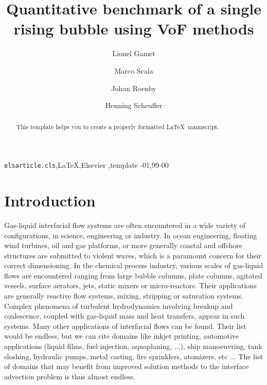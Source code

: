 \documentclass[review]{elsarticle}
\begin{document}
\begin{frontmatter}

\title{Quantitative benchmark of a single rising bubble using VoF methods}

\author[ifpenaddress]{Lionel Gamet}

\author[ifpenaddress]{Marco Scala}

\author[stromningaddress]{Johan Roenby}

\author[dlraddress]{Henning Scheufler}

\address[ifpenaddress]{IFPEN Lyon, Process Experimentation Division, 69360 Solaize, France}
\address[stromningaddress]{STROMNING, Luftmarinegade 62, 1432 K{\o}benhavn K, Denmark}
\address[dlraddress]{DLR German Aerospace Center, Institute of Space Systems, 28359 Bremen, Germany}

\begin{abstract}
This template helps you to create a properly formatted \LaTeX\ manuscript.
\end{abstract}

\begin{keyword}
\texttt{elsarticle.cls}\sep \LaTeX\sep Elsevier \sep template
-01\sep  99-00
\end{keyword}

\end{frontmatter}

\linenumbers

\section{Introduction}

Gas-liquid interfacial flow systems are often encountered in a wide variety of configurations, in science, engineering or industry. In ocean engineering, floating wind turbines, oil and gas platforms, or more generally coastal and offshore structures are submitted to violent waves, which is a paramount concern for their correct dimensioning. In the chemical process industry, various scales of gas-liquid flows are encountered ranging from large bubble columns, plate columns, agitated vessels, surface aerators, jets, static mixers or micro-reactors. Their applications are generally reactive flow systems, mixing, stripping or saturation systems. Complex phenomena of turbulent hydrodynamics involving breakup and coalescence, coupled with gas-liquid mass and heat transfers, appear in such systems. Many other applications of interfacial flows can be found. Their list would be endless, but we can cite domains like inkjet printing, automotive applications (liquid films, fuel injection, aquaplaning, ...), ship manoeuvring, tank sloshing, hydraulic pumps, metal casting, fire sprinklers, atomizers, etc ... The list of domains that may benefit from improved solution methods to the interface advection problem is thus almost endless. 
\end{document}
